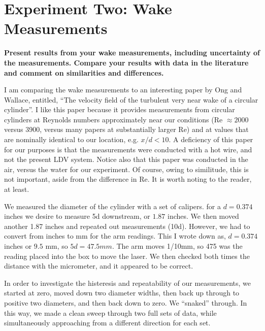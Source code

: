\documentclass{article}
\begin{document}

\section{Experiment Two: Wake Measurements}

\textbf{Present results from your wake measurements, including
uncertainty of the measurements. Compare your results with data in the
literature and comment on similarities and differences. } 

I am comparing the wake measurements to an interesting paper by Ong and
Wallace, entitled, ``The velocity field of the turbulent very near wake
of a circular cylinder''. I like this paper because it provides
measurements from circular cylinders at Reynolds numbers approximately
near our conditions (Re $\approx 2000$ versus 3900, versus many papers
at substantially larger Re) and at values that are nominally identical
to our location, e.g. $x/d < 10$. A deficiency of this paper for our
purposes is that the measurements were conducted with a hot wire, and
not the present LDV system. Notice also that this paper was conducted in the air, 
versus the water for our experiment. Of course, owing to similitude, this is not
important, aside from the difference in Re. It is worth noting to the reader, at least. 

We measured the diameter of the cylinder with a set of calipers. 
for a $d=0.374$ inches we desire to measure 5d downstream, or $1.87$
inches. We then moved another 1.87 inches and repeated out measurements
(10d). However, we had to convert from inches to mm for the arm
readings. This I wrote down as, $d=0.374$ inches or $9.5$ mm, so $5d =
47.5 mm$. The arm moves 1/10mm, so 475 was the reading placed into the
box to move the laser. We then checked both times the distance with the
micrometer, and it appeared to be correct. 

In order to investigate the histeresis and repeatability of our
measurements, we started at zero, moved down two diameter widths, then
back up through to positive two diameters, and then back down to
zero. We ``snaked'' through. In this way, we made a clean sweep through
two full sets of data, while simultaneously approaching from a different
direction for each set. 
\end{document}
